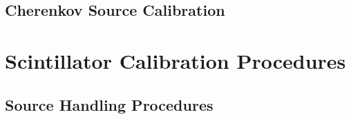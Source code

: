 \documentclass[10pt]{report}
\begin{document}
\chapter{Cherenkov Source Calibration}


\part{Scintillator Calibration Procedures}
\chapter{Source Handling Procedures}
%


\end{document}
